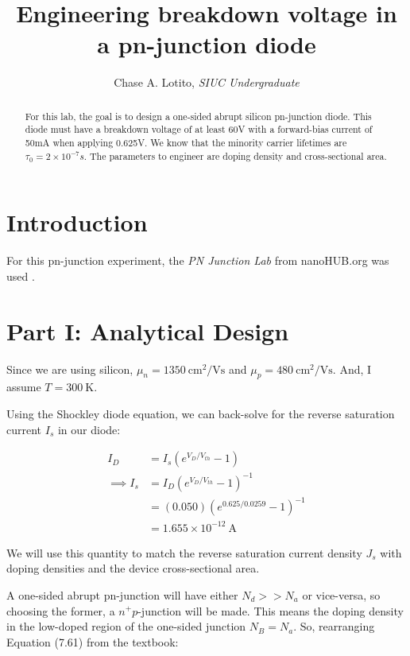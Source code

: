 \documentclass{IEEEtran}
\title{Engineering breakdown voltage in a pn-junction diode}
\author{Chase A. Lotito, \textit{SIUC Undergraduate}}
\date{}
\begin{document}
\maketitle %

\begin{abstract}
For this lab, the goal is to design a one-sided abrupt silicon pn-junction diode. This diode must have a breakdown voltage of at least 60V with a forward-bias current of 50mA when applying 0.625V. We know that the minority carrier lifetimes are \(\tau_0 = 2 \times 10^{-7} s\). The parameters to engineer are doping density and cross-sectional area.
\end{abstract}

\section*{Introduction}

For this pn-junction experiment, the \textit{PN Junction Lab} from nanoHUB.org was used \cite{sim}.

\section*{Part I: Analytical Design}

Since we are using silicon, \(\mu_n = 1350 ~ \text{cm}^2/\text{Vs}\) and \(\mu_p = 480 ~ \text{cm}^2/\text{Vs}\). And, I assume \(T=300 ~ \text{K}\).

Using the Shockley diode equation, we can back-solve for the reverse saturation current \(I_s\) in our diode:

\begin{align*}
    I_D &= I_s(e^{V_D/V_{th}} - 1) \\
    \implies I_s &= I_D(e^{V_D/V_{th}} - 1)^{-1} \\
    &= (0.050)(e^{0.625/0.0259} - 1)^{-1} \\
    &= 1.655 \times 10^{-12} ~ \text{A}
\end{align*}

We will use this quantity to match the reverse saturation current density \(J_s\) with doping densities and the device cross-sectional area.

A one-sided abrupt pn-junction will have either \(N_d >> N_a\) or vice-versa, so choosing the former, a \(n^+p\)-junction will be made. This means the doping density in the low-doped region of the one-sided junction \(N_B = N_a\). So, rearranging Equation (7.61) from the textbook:
\end{document}
